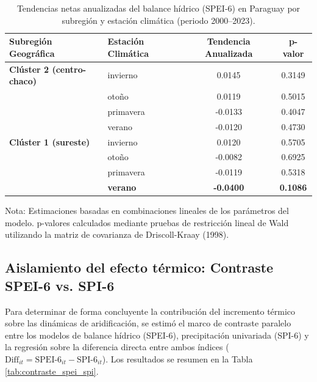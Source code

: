 \documentclass[11pt,a4paper]{article}
\begin{document}
\begin{table}[ht!]
\centering
\begin{threeparttable}
\caption{Tendencias netas anualizadas del balance hídrico (SPEI-6) en Paraguay por subregión y estación climática (periodo 2000--2023).}
\label{tab:pendientes_netas}
\vspace{-0.4cm}
\singlespacing
\small
\begin{tabular}{llcc}
\hline\hline
\textbf{Subregión Geográfica} & \textbf{Estación Climática} & \textbf{Tendencia Anualizada} & \textbf{p-valor} \\ \hline
\textbf{Clúster 2 (centro-chaco)} & invierno & 0.0145 & 0.3149 \\
                                 & otoño & 0.0119 & 0.5015 \\
                                 & primavera & -0.0133 & 0.4047 \\
                                 & verano & -0.0120 & 0.4730 \\ \hline
\textbf{Clúster 1 (sureste)}    & invierno & 0.0120 & 0.5705 \\
                                 & otoño & -0.0082 & 0.6925 \\
                                 & primavera & -0.0119 & 0.5318 \\
                                 & \textbf{verano} & \textbf{-0.0400} & \textbf{0.1086} \\ \hline\hline
\end{tabular}
\begin{tablenotes}
\item \scriptsize Nota: Estimaciones basadas en combinaciones lineales de los parámetros del modelo. p-valores calculados mediante pruebas de restricción lineal de Wald utilizando la matriz de covarianza de Driscoll-Kraay (1998).
\end{tablenotes}
\end{threeparttable}
\end{table}

\subsection{Aislamiento del efecto térmico: Contraste SPEI-6 vs. SPI-6}
Para determinar de forma concluyente la contribución del incremento térmico sobre las dinámicas de aridificación, se estimó el marco de contraste paralelo entre los modelos de balance hídrico (SPEI-6), precipitación univariada (SPI-6) y la regresión sobre la diferencia directa entre ambos índices ($\text{Diff}_{it} = \text{SPEI-6}_{it} - \text{SPI-6}_{it}$). Los resultados se resumen en la Tabla \ref{tab:contraste_spei_spi}.
\end{document}
